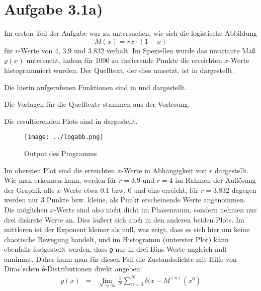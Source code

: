 \section*{Aufgabe 3.1a)}
\label{sec:1a}
Im ersten Teil der Aufgabe war zu untersuchen, wie sich die logistische
Abbildung $$M(x) = rx\cdot (1-x)$$ für $r$-Werte von 4, 3.9 und 3.832 verhält.
Im Speziellen wurde das invariante Maß $ϱ(x)$ untersucht, indem für 1000 zu
iterierende Punkte die erreichten $x$-Werte histogrammiert wurden. Der
Quelltext, der dies umsetzt, ist in  dargestellt.



Die hierin aufgerufenen Funktionen sind in  und 
dargestellt.





Die Vorlagen für die Quelltexte stammen aus der Vorlesung. 

Die resultierenden Plots sind in  dargestellt.
\begin{figure}[htb]
\centering
  \texttt{[image: ../logabb.png]}
  \caption{Output des Programms}
  \label{fig:logabb}
\end{figure}

Im obersten Plot sind die erreichten $x$-Werte in Abhängigkeit von $r$
dargestellt. Wie man erkennen kann, werden für $r=3.9$ und $r=4$ im Rahmen der
Auflösung der Graphik alle $x$-Werte etwa 0.1 bzw. 0 und eins erreicht, für
$r=3.832$ dagegen werden nur 3 Punkte bzw. kleine, als Punkt erscheinende Werte
angenommen. Die möglichen $x$-Werte sind also nicht dicht im Phasenraum,
sondern nehmen nur drei diskrete Werte an. Dies äußert sich auch in den
anderen beiden Plots. Im mittleren ist der Exponent kleiner als null, was
zeigt, dass es sich hier um keine chaotische Bewegung handelt, und im
Histogramm (unterster Plot) kann ebenfalls festgestellt werden, dass ϱ nur in
drei Bins Werte ungleich null annimmt. Daher kann man für diesen Fall die
Zustandsdichte mit Hilfe von Dirac’schen δ-Distributionen direkt angeben:
\begin{eqnarray}
ϱ(x) &=& \lim_{N\to\infty}\frac{1}{N}\sum_{n=0}^{N}δ(x - M^{(n)}(x^0)
\end{eqnarray}

